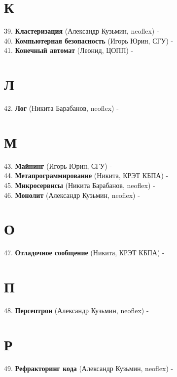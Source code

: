 \documentclass[14 pt]{extarticle}
\begin{document}
\section*{К}
    39. \textbf{Кластеризация} (Александр Кузьмин, neoflex) - \\
    
    40. \textbf{Компьютерная безопасность} (Игорь Юрин, СГУ) - \\
    
    41. \textbf{Конечный автомат} (Леонид, ЦОПП) -  \\
    
\section*{Л}
    42. \textbf{Лог} (Никита Барабанов, neoflex) - \\
    
\section*{М}
    43. \textbf{Майнинг} (Игорь Юрин, СГУ) - \\
    
    44. \textbf{Метапрограммирование} (Никита, КРЭТ КБПА) - \\
    
    45. \textbf{Микросервисы} (Никита Барабанов, neoflex) - \\
    
    46. \textbf{Монолит} (Александр Кузьмин, neoflex) - \\
    
\section*{О}
    47. \textbf{Отладочное сообщение} (Никита, КРЭТ КБПА) - \\
    
\section*{П}
    48. \textbf{Персептрон} (Александр Кузьмин, neoflex) - \\
    
\section*{Р}
    49. \textbf{Рефракторинг кода} (Александр Кузьмин, neoflex) - \\
    
\end{document}
